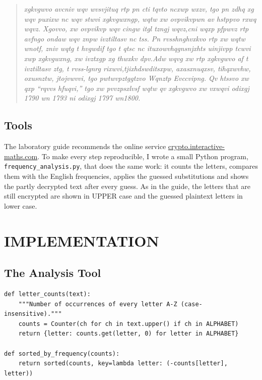 \documentclass[12pt,a4paper]{article}
\newenvironment{cryptotext}{\begin{quote}\raggedright\itshape\small}{\end{quote}}
\begin{document}
\begin{cryptotext}
xgkvgwvo avcniv wqv wvsvjituq rtp pn cti tqvto ncxwp wxzv, tgo pn zdhq xg wqv puxixw nc wqv stwvi xgkvgwxngp, wqtw xw ovpvikvpwn av hstppvo rxwq wqvz. Xgovvo, xw ovpvikvp wqv cingw itgl tzngj wqvz,cni wqxp pfpwvz rtp avfngo ondaw wqv znpw ivztiltasv nc tss. Pn rvsshnghvxkvo rtp xw wqtw wnotf, zniv wqtg t hvgwdif tgo t qtsc nc ituxowvhqgnsnjxhts uinjivpp tcwvi xwp xgkvgwxng, xw ivztxgp xg thwxkv dpv.Adw wqvg xw rtp xgkvgwvo af t ivztiltasv ztg, t rvss-lgnrg rixwvi,tjixhdswditsxpw, axasxnuqxsv, tihqxwvhw, oxusnztw, jtojvwvvi, tgo pwtwvpztggtzvo Wqnztp Evccvipng. Qv htssvo xw qxp ``rqvvs hfuqvi,'' tgo xw pvvzpsxlvsf wqtw qv xgkvgwvo xw vxwqvi odixgj 1790 wn 1793 ni odixgj 1797 wn1800.
\end{cryptotext}

\subsection{Tools}

The laboratory guide recommends the online service
\href{https://crypto.interactive-maths.com/frequency-analysis-breaking-the-code.html}{crypto.interactive-maths.com}.
To make every step reproducible, I wrote a small Python program,
\texttt{frequency\_analysis.py}, that does the same work: it counts the letters, compares
them with the English frequencies, applies the guessed substitutions and shows the partly
decrypted text after every guess. As in the guide, the letters that are still encrypted are
shown in UPPER case and the guessed plaintext letters in lower case.

\section{IMPLEMENTATION}

\subsection{The Analysis Tool}

\begin{lstlisting}[caption={Counting the letters of the ciphertext}]
def letter_counts(text):
    """Number of occurrences of every letter A-Z (case-insensitive)."""
    counts = Counter(ch for ch in text.upper() if ch in ALPHABET)
    return {letter: counts.get(letter, 0) for letter in ALPHABET}

def sorted_by_frequency(counts):
    return sorted(counts, key=lambda letter: (-counts[letter], letter))
\end{lstlisting}
\end{document}
